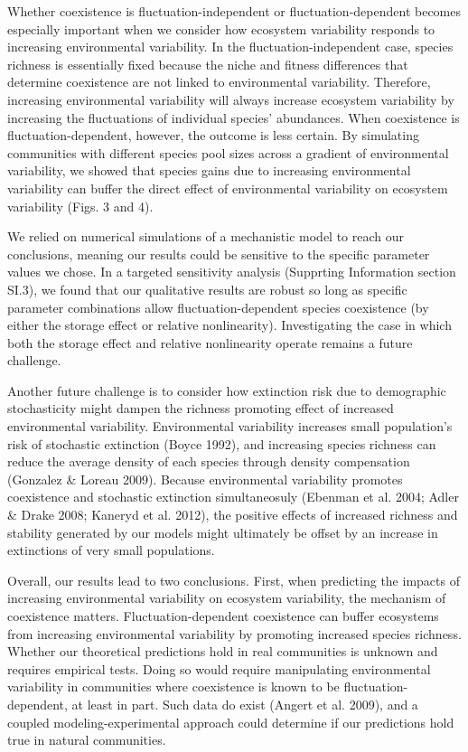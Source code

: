 \documentclass[12pt,]{article}
\begin{document}
Whether coexistence is fluctuation-independent or fluctuation-dependent
becomes especially important when we consider how ecosystem variability
responds to increasing environmental variability. In the
fluctuation-independent case, species richness is essentially fixed
because the niche and fitness differences that determine coexistence are
not linked to environmental variability. Therefore, increasing
environmental variability will always increase ecosystem variability by
increasing the fluctuations of individual species' abundances. When
coexistence is fluctuation-dependent, however, the outcome is less
certain. By simulating communities with different species pool sizes
across a gradient of environmental variability, we showed that species
gains due to increasing environmental variability can buffer the direct
effect of environmental variability on ecosystem variability (Figs. 3
and 4).

We relied on numerical simulations of a mechanistic model to reach our
conclusions, meaning our results could be sensitive to the specific
parameter values we chose. In a targeted sensitivity analysis (Supprting
Information section SI.3), we found that our qualitative results are
robust so long as specific parameter combinations allow
fluctuation-dependent species coexistence (by either the storage effect
or relative nonlinearity). Investigating the case in which both the
storage effect and relative nonlinearity operate remains a future
challenge.

Another future challenge is to consider how extinction risk due to
demographic stochasticity might dampen the richness promoting effect of
increased environmental variability. Environmental variability increases
small population's risk of stochastic extinction (Boyce 1992), and
increasing species richness can reduce the average density of each
species through density compensation (Gonzalez \& Loreau 2009). Because
environmental variability promotes coexistence and stochastic extinction
simultaneosuly (Ebenman et al. 2004; Adler \& Drake 2008; Kaneryd et al.
2012), the positive effects of increased richness and stability
generated by our models might ultimately be offset by an increase in
extinctions of very small populations.

Overall, our results lead to two conclusions. First, when predicting the
impacts of increasing environmental variability on ecosystem
variability, the mechanism of coexistence matters. Fluctuation-dependent
coexistence can buffer ecosystems from increasing environmental
variability by promoting increased species richness. Whether our
theoretical predictions hold in real communities is unknown and requires
empirical tests. Doing so would require manipulating environmental
variability in communities where coexistence is known to be
fluctuation-dependent, at least in part. Such data do exist (Angert et
al. 2009), and a coupled modeling-experimental approach could determine
if our predictions hold true in natural communities.
\end{document}
